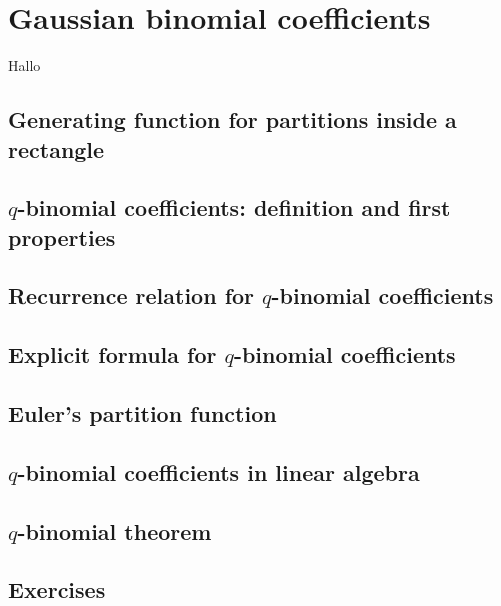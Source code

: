 \section{Gaussian binomial coefficients}\label{gaussian} 

Hallo

\subsection{Generating function for partitions inside a rectangle}

\subsection{$q$-binomial coefficients: definition and first properties}

\subsection{Recurrence relation for $q$-binomial coefficients}

\subsection{Explicit formula for $q$-binomial coefficients}

\subsection{Euler's partition function}

\subsection{$q$-binomial coefficients in linear algebra}

\subsection{$q$-binomial theorem}

\subsection{Exercises}